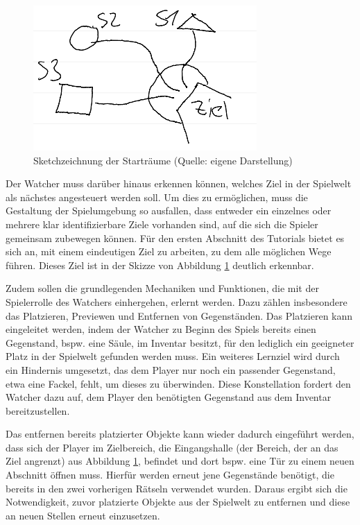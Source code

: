 \begin{figure}[ht]
\centering
\includegraphics[width=1\linewidth]{content/pictures/Startplaces_Sketch.png}
\caption{Sketchzeichnung der Starträume (Quelle: eigene Darstellung)}
\label{fig:sketch-starterrooms}
\end{figure}

Der Watcher muss darüber hinaus erkennen können, welches Ziel in der Spielwelt als nächstes angesteuert werden soll. Um dies zu ermöglichen, muss die Gestaltung der Spielumgebung so ausfallen, dass entweder ein einzelnes oder mehrere klar identifizierbare Ziele vorhanden sind, auf die sich die Spieler gemeinsam zubewegen können. Für den ersten Abschnitt des Tutorials bietet es sich an, mit einem eindeutigen Ziel zu arbeiten, zu dem alle möglichen Wege führen. Dieses Ziel ist in der Skizze von Abbildung \ref{fig:sketch-starterrooms} deutlich erkennbar.

Zudem sollen die grundlegenden Mechaniken und Funktionen, die mit der Spielerrolle des Watchers einhergehen, erlernt werden. Dazu zählen insbesondere das Platzieren, Previewen und Entfernen von Gegenständen. Das Platzieren kann eingeleitet werden, indem der Watcher zu Beginn des Spiels bereits einen Gegenstand, bspw. eine Säule, im Inventar besitzt, für den lediglich ein geeigneter Platz in der Spielwelt gefunden werden muss. Ein weiteres Lernziel wird durch ein Hindernis umgesetzt, das dem Player nur noch ein passender Gegenstand, etwa eine Fackel, fehlt, um dieses zu überwinden. Diese Konstellation fordert den Watcher dazu auf, dem Player den benötigten Gegenstand aus dem Inventar bereitzustellen.

Das entfernen bereits platzierter Objekte kann wieder dadurch eingeführt werden, dass sich der Player im Zielbereich, die Eingangshalle (der Bereich, der an das Ziel angrenzt) aus Abbildung \ref{fig:sketch-starterrooms}, befindet und dort bspw. eine Tür zu einem neuen Abschnitt öffnen muss. Hierfür werden erneut jene Gegenstände benötigt, die bereits in den zwei vorherigen Rätseln verwendet wurden. Daraus ergibt sich die Notwendigkeit, zuvor platzierte Objekte aus der Spielwelt zu entfernen und diese an neuen Stellen erneut einzusetzen.


